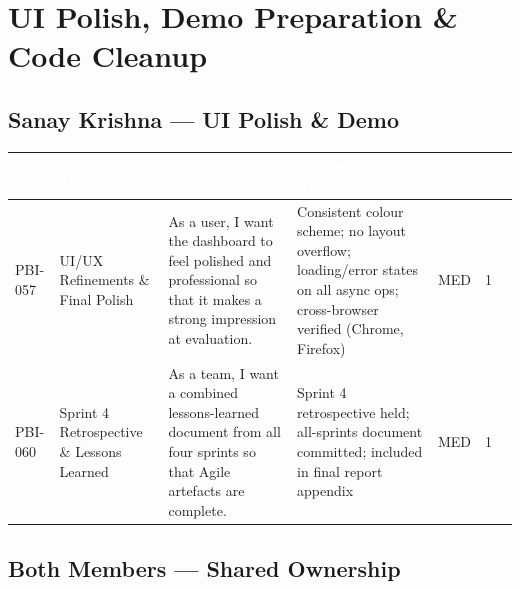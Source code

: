 \documentclass[10pt,a4paper]{article}
\begin{document}
\vspace{0.8em}

\section{UI Polish, Demo Preparation \& Code Cleanup}

\subsection*{Sanay Krishna — UI Polish \& Demo}

\renewcommand{\arraystretch}{1.45}
\begin{tabularx}{\textwidth}{|L{1.5cm}|L{3cm}|X|L{3cm}|L{1cm}|L{0.6cm}|}
\hline
{}
\textcolor{white}{\textbf{ID}} &
\textcolor{white}{\textbf{Title}} &
\textcolor{white}{\textbf{User Story}} &
\textcolor{white}{\textbf{Acceptance Criteria}} &
\textcolor{white}{\textbf{Pri.}} &
\textcolor{white}{\textbf{SP}} \\ \hline

PBI-057 &
UI/UX Refinements \& Final Polish &
As a user, I want the dashboard to feel polished and professional so that it makes a strong impression at evaluation. &
Consistent colour scheme; no layout overflow; loading/error states on all async ops; cross-browser verified (Chrome, Firefox) &
MED & 1 \\ \hline

PBI-060 &
Sprint 4 Retrospective \& Lessons Learned &
As a team, I want a combined lessons-learned document from all four sprints so that Agile artefacts are complete. &
Sprint 4 retrospective held; all-sprints document committed; included in final report appendix &
MED & 1 \\ \hline

\end{tabularx}

\vspace{0.6em}
\subsection*{Both Members — Shared Ownership}
\end{document}
